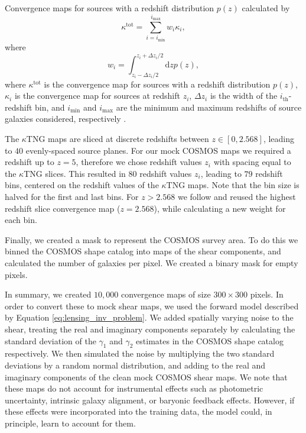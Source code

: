 \documentclass[fleqn,usenatbib]{mnras}
\begin{document}
Convergence maps for sources with a redshift distribution $p(z)$ calculated by
\begin{equation}\label{eq:kappa_tot}
	\kappa^{\text{tot}} = \sum_{i=i_{\text{min}}}^{i_{\text{max}}}w_i \kappa_i,
\end{equation}
where
\begin{equation}\label{eq:kappa_tot_weights}
	w_i = \int_{z_i - \Delta z_i/2}^{z_i + \Delta z_i/2} \text{d}z p(z),
\end{equation}
where $\kappa^{\text{tot}}$ is the convergence map for sources with a redshift distribution $p(z)$, $\kappa_i$ 
is the convergence map for sources at redshift $z_i$, $\Delta z_i$ is the width of the $i_{\text{th}}$-redshift bin, 
and $i_{\text{min}}$ and $i_{\text{max}}$ are the minimum and maximum redshifts of source galaxies considered, respectively 
\citep{makiya2021ray}.

The $\kappa$TNG maps are sliced at discrete redshifts between $z \in [0, 2.568]$, leading to $40$ evenly-spaced source planes. For our mock COSMOS maps we required a redshift up to $z=5$, therefore we chose redshift values $z_i$ with spacing equal to the $\kappa$TNG slices. This resulted in $80$ redshift values $z_i$, leading to $79$ redshift bins, centered on the redshift values of the $\kappa$TNG maps. 
Note that the bin size is halved for the first and last bins. For $z > 2.568$ we follow \citet{remy2023probabilistic} and reused the highest redshift slice convergence map ($z=2.568$), while calculating a new weight for each bin.

Finally, we created a mask to represent the COSMOS survey area. To do this we binned the COSMOS shape catalog into maps of the shear components, and calculated the number of galaxies per pixel. 
We created a binary mask for empty pixels.

In summary, we created $10,000$ convergence maps of size $300\times300$ pixels. In order to convert these to mock shear maps, we used the forward model described by Equation \eqref{eq:lensing_inv_problem}. We added spatially varying noise to the shear, treating the real and imaginary components separately by calculating the standard deviation of the $\gamma_1$ and $\gamma_2$ estimates in the COSMOS shape catalog respectively. We then simulated the noise by multiplying the two standard deviations by a random normal distribution, and adding to the real and imaginary components of the clean mock COSMOS shear maps. We note that these maps do not account for instrumental effects such as photometric uncertainty, intrinsic galaxy alignment, or baryonic feedback effects. However, if these effects were incorporated into the training data, the model could, in principle, learn to account for them.
\end{document}

